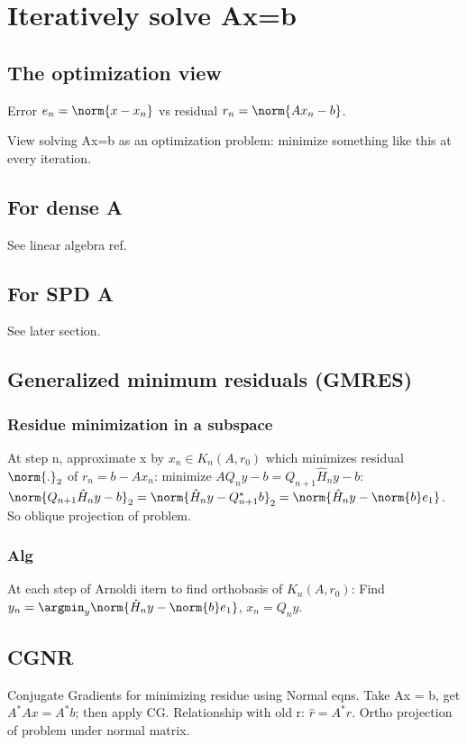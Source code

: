 \documentclass[oneside, article]{memoir}
\begin{document}
\chapter{Iteratively solve Ax=b}
\section{The optimization view}
Error $e_{n} = \norm{x-x_{n}}$ vs residual $r_{n} = \norm{Ax_{n}-b}$.

View solving Ax=b as an optimization problem: minimize something like this at every iteration.

\section{For dense A}
See linear algebra ref.

\section{For SPD A}
See later section.

\section{Generalized minimum residuals (GMRES)}
\subsection{Residue minimization in a subspace}
At step n, approximate x by $x_{n} \in K_{n}(A, r_{0})$ which minimizes residual $\norm{.}_{2}$ of $r_{n} = b - Ax_{n}$: minimize $AQ_{n}y - b = Q_{n+1}\hat{H}_{n}y-b$: $\norm{Q_{n+1}\hat{H}_{n}y-b}_{2} = \norm{\hat{H}_{n}y-Q_{n+1}^{*}b}_{2} = \norm{\hat{H}_{n}y-\norm{b}e_{1}}$. So oblique projection of problem.

\subsection{Alg}
At each step of Arnoldi itern to find orthobasis of $K_{n}(A, r_{0})$: Find $y_{n} = \argmin_{y} \norm{\hat{H}_{n}y-\norm{b}e_{1}}$, $x_{n}= Q_{n}y$.

\section{CGNR}
Conjugate Gradients for minimizing residue using Normal eqns. Take Ax = b, get $A^{*}Ax = A^{*}b$; then apply CG. Relationship with old r: $\hat{r} = A^{*}r$. Ortho projection of problem under normal matrix.
\end{document}
